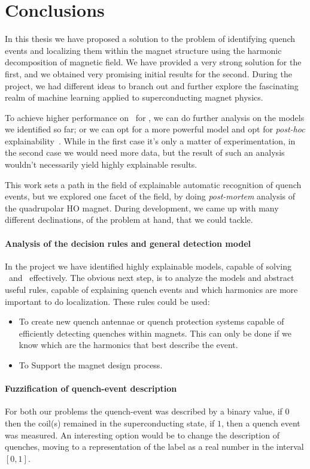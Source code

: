\chapter{Conclusions}
\label{chp:conclusion}
In this thesis we have proposed a solution to the problem of identifying quench events and
localizing them within the magnet structure using the harmonic decomposition of magnetic field. We
have provided a very strong solution for the first, and we obtained very promising initial results
for the second. During the project, we had different ideas to branch out and further explore the
fascinating realm of machine learning applied to superconducting magnet physics.

To achieve higher performance on \dts\ for \qlp, we can do further analysis on the models we
identified so far; or we can opt for a more powerful model and opt for \emph{post-hoc}
explainability~\cite{retzlaff2024}. While in the first case it's only a matter of experimentation,
in the second case we would need more data, but the result of such an analysis wouldn't necessarily
yield highly explainable results.

This work sets a path in the field of explainable automatic recognition of quench events, but we
explored one facet of the field, by doing \emph{post-mortem} analysis of the quadrupolar HO magnet.
During development, we came up with many different declinations, of the problem at hand, that we
could tackle.

\subsubsection{Analysis of the decision rules and general detection model}
In the project we have identified highly explainable models, capable of solving \qrp\ and \qlp\
effectively. The obvious next step, is to analyze the models and abstract useful rules, capable of
explaining quench events and which harmonics are more important to do localization. These rules could be used:
\begin{itemize}
	\item To create new quench antennae or quench protection systems capable of efficiently
	      detecting quenches within magnets. This can only be done if we know which are the
	      harmonics that best describe the event.
	\item To Support the magnet design process.
\end{itemize}

\subsubsection{Fuzzification of quench-event description}
For both our problems the quench-event was described by a binary value, if $0$ then the coil(s)
remained in the superconducting state, if $1$, then a quench event was measured. An interesting option would be to change the description of quenches,
moving to a representation of the label as a real number in the interval $[0, 1]$.

